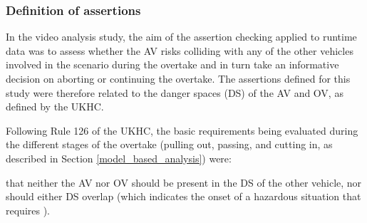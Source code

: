 %


\subsubsection{Definition of assertions}
\label{DS_assessment}
In the video analysis study, the aim of the assertion checking applied to runtime data was to assess whether the AV risks colliding with any of the other vehicles involved in the scenario during the overtake and in turn take an informative decision on aborting or continuing the overtake. The assertions defined for this study were therefore related to the danger spaces (DS) of the AV and OV, as defined by the UKHC.

%
Following Rule 126 of the UKHC, the basic requirements being evaluated during the different stages of the overtake (pulling out, passing, and cutting in, as described in Section \ref{model_based_analysis}) were:

 that neither the AV nor OV should be present in the DS of the other vehicle, nor should either DS overlap (which indicates the onset of a hazardous situation that requires ). 
%
%


